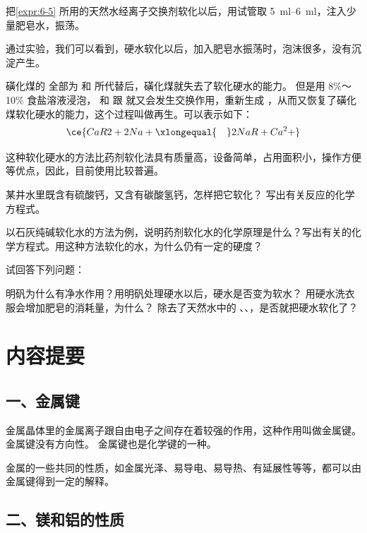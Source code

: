 \begin{Experiment}
  把\cref{expr:6-5} 所用的天然水经离子交换剂软化以后，用试管取 \qtyrange{5}{6}{ml}，注入少量肥皂水，振荡。
\end{Experiment}
通过实验，我们可以看到，硬水软化以后，加入肥皂水振荡时，泡沫很多，没有沉淀产生。

磺化煤的  全部为  和  所代替后，磺化煤就失去了软化硬水的能力。
但是用 8\%～10\% 食盐溶液浸泡， 和  跟  就又会发生交换作用，重新生成 ，从而又恢复了磺化煤软化硬水的能力，这个过程叫做再生。可以表示如下：
\[ \ce{ CaR2 +2Na+ \xlongequal{\quad} 2NaR +Ca^2+ }\]

这种软化硬水的方法比药剂软化法具有质量高，设备简单，占用面积小，操作方便等优点，因此，目前使用比较普遍。

\begin{Practice}[习题]
\begin{question}
  \item 某井水里既含有硫酸钙，又含有碳酸氢钙，怎样把它软化？ 写出有关反应的化学方程式。
  \item 以石灰纯碱软化水的方法为例，说明药剂软化水的化学原理是什么？写出有关的化学方程式。用这种方法软化的水，为什么仍有一定的硬度？
  \item 试回答下列问题：
  \begin{tasks}[label=(\arabic*)]
    \task 明矾为什么有净水作用？用明矾处理硬水以后，硬水是否变为软水？
    \task 用硬水洗衣服会增加肥皂的消耗量，为什么？
    \task 除去了天然水中的 、、，是否就把硬水软化了？
  \end{tasks}
\end{question}
\end{Practice}

\section*{内容提要}
\setcounter{subsection}{0}
\subsection*{一、金属键}
金属晶体里的金属离子跟自由电子之间存在着较强的作用，这种作用叫做金属键。
金属键没有方向性。
金属键也是化学键的一种。

金属的一些共同的性质，如金属光泽、易导电、易导热、有延展性等等，都可以由金属键得到一定的解释。

\subsection*{二、镁和铝的性质}\setcounter{subsubsection}{0}
